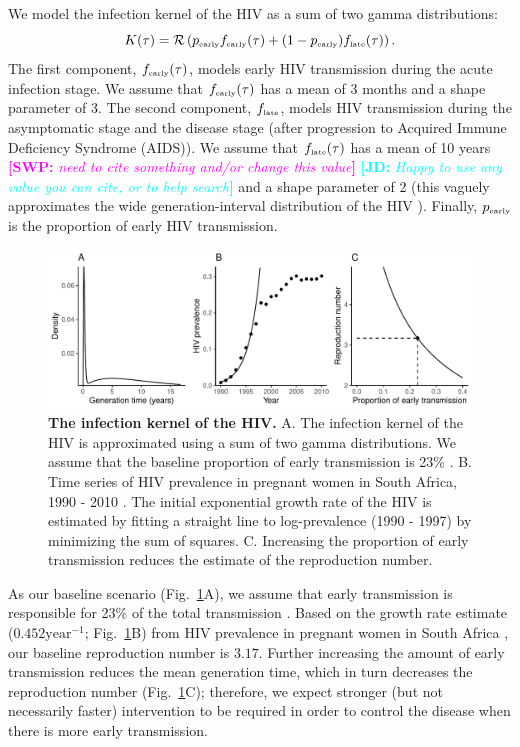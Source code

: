 \documentclass[12pt]{article}\usepackage[]{graphicx}\usepackage[]{color}
\newcommand{\comment}[3]{\textcolor{#1}{\textbf{[#2: }\textit{#3}\textbf{]}}}
\newcommand{\jd}[1]{\comment{cyan}{JD}{#1}}
\newcommand{\swp}[1]{\comment{magenta}{SWP}{#1}}
\newcommand{\tsub}[2]{#1_{{\textrm{\tiny #2}}}}
\newcommand{\figref}[1]{Fig.~\ref{fig:#1}}
\newcommand{\figlab}[1]{\label{fig:#1}}
\begin{document}
We model the infection kernel of the HIV as a sum of two gamma distributions:
\begin{equation}
K(\tau) = \mathcal R \left(\tsub{p}{early} \tsub{f}{early}(\tau) + (1-\tsub{p}{early}) \tsub{f}{late}(\tau) \right).
\end{equation}
The first component, $\tsub{f}{early}(\tau)$, models early HIV transmission during the acute infection stage.
We assume that $\tsub{f}{early}(\tau)$ has a mean of 3 months \citep{hollingsworth2008hiv} and a shape parameter of 3.
The second component, $\tsub{f}{late}$, models HIV transmission during the asymptomatic stage and the disease stage (after progression to Acquired Immune Deficiency Syndrome (AIDS)).
We assume that $\tsub{f}{late}(\tau)$ has a mean of 10 years \swp{need to cite something and/or change this value} \jd{Happy to use any value you can cite, or to help search} and a shape parameter of 2 (this vaguely approximates the wide generation-interval distribution of the HIV \citep{fraser2004factors}).
Finally, $\tsub{p}{early}$ is the proportion of early HIV transmission.

\begin{figure}[!t]
\includegraphics[width=\textwidth]{../figure/figure1.pdf}
\caption{
\textbf{The infection kernel of the HIV.}
A. The infection kernel of the HIV is approximated using a sum of two gamma distributions. We assume that the baseline proportion of early transmission is 23\% \citep{hayes2006amplified}.
B. Time series of HIV prevalence in pregnant women in South Africa, 1990 - 2010 \citep{barron2013eliminating}. The initial exponential growth rate of the HIV is estimated by fitting a straight line to log-prevalence (1990 - 1997) by minimizing the sum of squares.
C. Increasing the proportion of early transmission reduces the estimate of the reproduction number.
}
\figlab{example}
\end{figure}

As our baseline scenario (\figref{example}A), we assume that early transmission is responsible for 23\% of the total transmission \citep{hayes2006amplified}.
Based on the growth rate estimate ($0.452 \textrm{year}^{-1}$; \figref{example}B) from HIV prevalence in pregnant women in South Africa \citep{barron2013eliminating}, our baseline reproduction number is $3.17$.
Further increasing the amount of early transmission reduces the mean generation time, which in turn decreases the reproduction number (\figref{example}C);
therefore, we expect stronger (but not necessarily faster) intervention to be required in order to control the disease when there is more early transmission.
\end{document}
